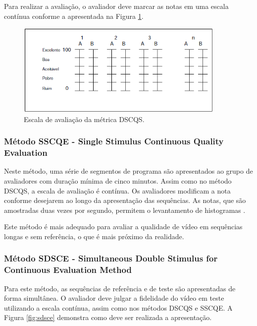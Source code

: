 Para realizar a avaliação, o avaliador deve marcar as notas em uma escala contínua conforme a apresentada na Figura \ref{fig:dscqsescala}.

\begin{figure}[!htb]
	\centering
	\includegraphics[width=0.9\textwidth]{./imgs/dscqsescala.png}
	\caption{Escala de avaliação da métrica DSCQS.}
	\label{fig:dscqsescala}
\end{figure}

\subsubsection[Método SSCQE]{Método SSCQE - Single Stimulus Continuous Quality Evaluation}

Neste método, uma série de segmentos de programa são apresentados ao grupo de avaliadores com duração mínima de cinco minutos. Assim como no método DSCQS, a escala de avaliação é contínua. Os avaliadores modificam a nota conforme desejarem ao longo da apresentação das sequências. As notas, que são amostradas duas vezes por segundo, permitem o levantamento de histogramas \cite{rehme}.

Este método é mais adequado para avaliar a qualidade de vídeo em sequências longas e sem referência, o que é mais próximo da realidade.

\subsubsection[Método SDSCE]{Método SDSCE - Simultaneous Double Stimulus for Continuous Evaluation Method}

Para este método, as sequências de referência e de teste são apresentadas de forma simultânea. O avaliador deve julgar a fidelidade do vídeo em teste utilizando a escala contínua, assim como nos métodos DSCQS e SSCQE. A Figura \ref{fig:sdsce} demonstra como deve ser realizada a apresentação.

